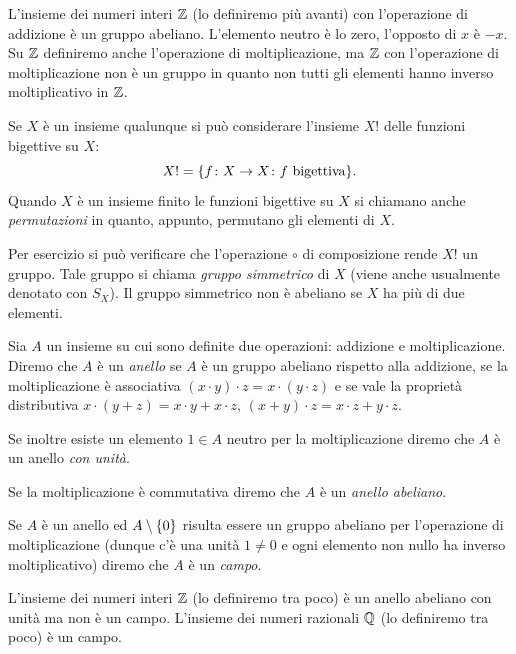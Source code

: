 \begin{example}
  L'insieme dei numeri interi ${\mathbb Z}$ (lo definiremo più avanti) 
  con l'operazione di addizione 
  è un gruppo abeliano. 
  L'elemento neutro è lo zero, l'opposto di $x$ è $-x$.
  Su ${\mathbb Z}$ definiremo anche l'operazione di moltiplicazione,
  ma ${\mathbb Z}$ con l'operazione di moltiplicazione non è un gruppo 
  in quanto non tutti gli elementi hanno inverso moltiplicativo in ${\mathbb Z}$.
\end{example}

\begin{example}
  Se $X$ è un insieme qualunque si può considerare l'insieme
  $X!$ delle funzioni bigettive su $X$:
  \[
    X! = {\left\{ f\colon X\to X\colon f \text{ bigettiva} \right\}}.
  \]
  Quando $X$ è un insieme finito le funzioni bigettive su $X$ si chiamano 
  anche \emph{permutazioni} in quanto, appunto, permutano gli elementi di $X$.

  Per esercizio si può verificare che l'operazione $\circ$ di composizione 
  rende $X!$ un gruppo.
  Tale gruppo si chiama \emph{gruppo simmetrico} di $X$ 
  (viene anche usualmente denotato con $S_X$).
  Il gruppo simmetrico non è abeliano se $X$ ha più di due elementi.
\end{example}

\begin{definition}
  \label{def:anello}%
  \label{def:campo}%
  Sia $A$ un insieme su cui sono definite due operazioni: 
  addizione e moltiplicazione.  
  Diremo che $A$ è un \emph{anello} se $A$ è un gruppo abeliano rispetto alla 
  addizione, 
  se la moltiplicazione è associativa $(x\cdot y)\cdot z = x\cdot (y\cdot z)$ 
  e se vale la proprietà distributiva $x\cdot(y+z) = x\cdot y + x\cdot z$,
  $(x+y)\cdot z = x\cdot z + y\cdot z$.

  Se inoltre esiste un elemento $1\in A$ neutro per la moltiplicazione 
  diremo che $A$ è un anello \emph{con unità}.

  Se la moltiplicazione è commutativa diremo che $A$ è un \emph{anello abeliano}.

  Se $A$ è un anello ed $A\setminus {\left\{ 0 \right\}}$ risulta essere un gruppo abeliano
  per l'operazione di moltiplicazione 
  (dunque c'è una unità $1\neq 0$ e ogni elemento non nullo ha inverso moltiplicativo)
  diremo che $A$ è un \emph{campo}.
\end{definition}

\begin{example}
  L'insieme dei numeri interi ${\mathbb Z}$ (lo definiremo tra poco) è un anello abeliano con unità
  ma non è un campo.
  L'insieme dei numeri razionali ${\mathbb Q}$ (lo definiremo tra poco) è un campo.
\end{example}

